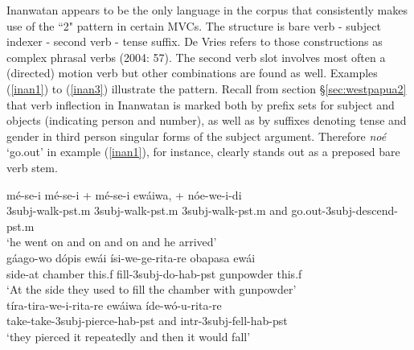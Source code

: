 Inanwatan appears to be the only language in the corpus that consistently makes use of the ``2" pattern in certain MVCs. The structure is bare verb - subject indexer - second verb - tense suffix. De Vries refers to those constructions as complex phrasal verbs (2004: 57). The second verb slot involves most often a (directed) motion verb but other combinations are found as well. Examples (\ref{inan1}) to (\ref{inan3}) illustrate the pattern. Recall from section §\ref{sec:westpapua2} that verb inflection in Inanwatan is marked both by prefix sets for subject and objects (indicating person and number), as well as by suffixes denoting tense and gender in third person singular forms of the subject argument. Therefore \textit{noé} `go.out' in example (\ref{inan1}), for instance, clearly stands out as a preposed bare verb stem.

\ea \label{inan1}
\gll mé-se-i mé-se-i + mé-se-i ewáiwa, + nóe-we-i-di \\
3\acs{subj}-walk-\acs{pst}.\acs{m} 3\acs{subj}-walk-\acs{pst}.\acs{m} 3\acs{subj}-walk-\acs{pst}.\acs{m} and go.out-3\acs{subj}-descend-\acs{pst}.\acs{m} \\
\glft `he went on and on and on and he arrived' \\ 
\z
\xe
\ea \label{inan2}
\gll gáago-wo dópis ewái ísi-we-ge-rita-re obapasa ewái \\
side-at chamber this.\acs{f} fill-3\acs{subj}-do-\acs{hab}-\acs{pst} gunpowder this.\acs{f} \\
\glft `At the side they used to fill the chamber with gunpowder' \\ 
\z
\xe
\ea \label{inan3}
\gll tíra-tira-we-i-rita-re ewáiwa íde-wó-u-rita-re \\
take-take-3\acs{subj}-pierce-\acs{hab}-\acs{pst} and \acs{intr}-3\acs{subj}-fell-\acs{hab}-\acs{pst} \\
\glft `they pierced it repeatedly and then it would fall' \\ 
\z
\xe


